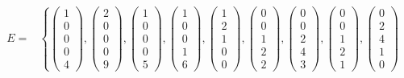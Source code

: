 \documentclass{commat}
\newcommand{\cop}{{\mathcal{COP}}}
\DeclareMathOperator{\MinC}{Min_{\cop}}
\begin{document}
\begin{align*}
    \MinC E = & \left\{
        \begin{pmatrix}
1 \\ 0 \\ 0 \\ 0 \\ 4
\end{pmatrix}
,
        \begin{pmatrix}
2 \\ 0 \\ 0 \\ 0 \\ 9
\end{pmatrix}
,
        \begin{pmatrix}
1 \\ 0 \\ 0 \\ 0 \\ 5
\end{pmatrix}
,
        \begin{pmatrix}
1 \\ 0 \\ 0 \\ 1 \\ 6
\end{pmatrix}
,
        \begin{pmatrix}
1 \\ 2 \\ 1 \\ 0 \\ 0
\end{pmatrix}
,
        \begin{pmatrix}
0 \\ 0 \\ 1 \\ 2 \\ 2
\end{pmatrix}
,
        \begin{pmatrix}
0 \\ 0 \\ 2 \\ 4 \\ 3
\end{pmatrix}
,
        \begin{pmatrix}
0 \\ 0 \\ 1 \\ 2 \\ 1
\end{pmatrix}
,
        \begin{pmatrix}
0 \\ 2 \\ 4 \\ 1 \\ 0

\end{pmatrix}
\end{align*}
\end{document}
